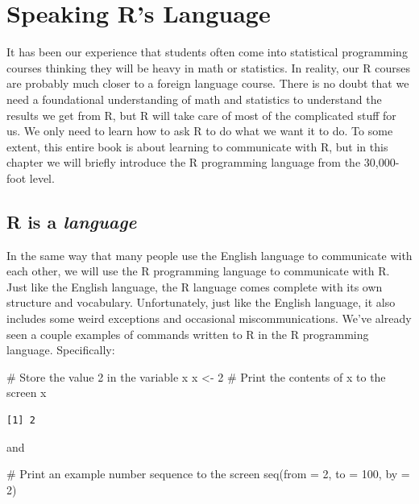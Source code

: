 \documentclass[
  letterpaper,
  DIV=11,
  numbers=noendperiod]{scrreprt}
\newenvironment{Shaded}{\begin{snugshade}}{\end{snugshade}}
\newcommand{\AttributeTok}[1]{\textcolor[rgb]{0.40,0.45,0.13}{#1}}
\newcommand{\CommentTok}[1]{\textcolor[rgb]{0.37,0.37,0.37}{#1}}
\newcommand{\DecValTok}[1]{\textcolor[rgb]{0.68,0.00,0.00}{#1}}
\newcommand{\FunctionTok}[1]{\textcolor[rgb]{0.28,0.35,0.67}{#1}}
\newcommand{\NormalTok}[1]{\textcolor[rgb]{0.00,0.23,0.31}{#1}}
\newcommand{\OtherTok}[1]{\textcolor[rgb]{0.00,0.23,0.31}{#1}}
\begin{document}
\chapter{Speaking R's Language}\label{speaking-rs-language}

It has been our experience that students often come into statistical
programming courses thinking they will be heavy in math or statistics.
In reality, our R courses are probably much closer to a foreign language
course. There is no doubt that we need a foundational understanding of
math and statistics to understand the results we get from R, but R will
take care of most of the complicated stuff for us. We only need to learn
how to ask R to do what we want it to do. To some extent, this entire
book is about learning to communicate with R, but in this chapter we
will briefly introduce the R programming language from the 30,000-foot
level.

\section{\texorpdfstring{R is a
\emph{language}}{R is a language}}\label{r-is-a-language}

In the same way that many people use the English language to communicate
with each other, we will use the R programming language to communicate
with R. Just like the English language, the R language comes complete
with its own structure and vocabulary. Unfortunately, just like the
English language, it also includes some weird exceptions and occasional
miscommunications. We've already seen a couple examples of commands
written to R in the R programming language. Specifically:

\begin{Shaded}
\begin{Highlighting}[]
\CommentTok{\# Store the value 2 in the variable x}
\NormalTok{x }\OtherTok{\textless{}{-}} \DecValTok{2}
\CommentTok{\# Print the contents of x to the screen}
\NormalTok{x}
\end{Highlighting}
\end{Shaded}

\begin{verbatim}
[1] 2
\end{verbatim}

and

\begin{Shaded}
\begin{Highlighting}[]
\CommentTok{\# Print an example number sequence to the screen}
\FunctionTok{seq}\NormalTok{(}\AttributeTok{from =} \DecValTok{2}\NormalTok{, }\AttributeTok{to =} \DecValTok{100}\NormalTok{, }\AttributeTok{by =} \DecValTok{2}\NormalTok{)}
\end{Highlighting}
\end{Shaded}
\end{document}

